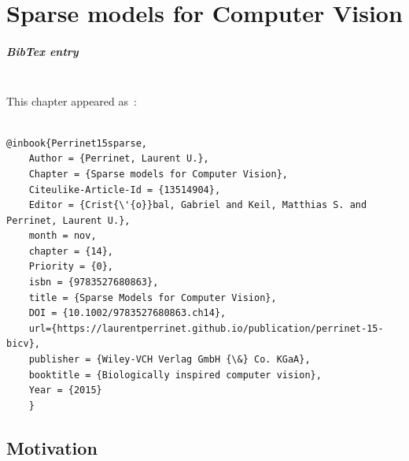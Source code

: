 \documentclass[a4paper, 11pt]{book}
\author{Perrinet}\title{\Title}
\newcommand{\AuthorA}{Laurent U.~Perrinet}%
\newcommand{\Title}{Sparse models for Computer Vision}%
\newcommand{\Abstract}{
The representation of images in the brain is known to be sparse.
That is, as neural activity is recorded in a visual area
---for instance the primary visual cortex of primates---
only a few neurons are active at a given time with respect to the whole population.
It is believed that such a property reflects the efficient match of the representation
with the statistics of natural scenes.
Applying such a paradigm to computer vision
therefore seems a promising approach towards more biomimetic algorithms.
Herein, we will describe a biologically-inspired approach to this problem.
First, we will describe an unsupervised learning paradigm
which is particularly adapted to the efficient coding of image patches.
Then, we will outline a complete multi-scale framework ---SparseLets---
implementing a biologically inspired sparse representation of natural images.
Finally, we will propose novel methods for integrating
prior information into these algorithms and provide some preliminary experimental results.
We will conclude by giving some perspective on applying such algorithms to computer vision.
More specifically, we will propose that bio-inspired approaches
may be applied to computer vision using predictive coding schemes,
sparse models being one simple and efficient instance of such schemes.
}%
\begin{document}
%
%
\frontmatter
\mainmatter
\addtocounter{chapter}{13} %
\chapter{\Title}

\paragraph{BibTex entry}~~\\

This chapter appeared as~\citep{Perrinet15sparse}:
\begin{verbatim}

@inbook{Perrinet15sparse,
	Author = {Perrinet, Laurent U.},
	Chapter = {Sparse models for Computer Vision},
	Citeulike-Article-Id = {13514904},
	Editor = {Crist{\'{o}}bal, Gabriel and Keil, Matthias S. and Perrinet, Laurent U.},
    month = nov,
	chapter = {14},
	Priority = {0},
	isbn = {9783527680863},
	title = {Sparse Models for Computer Vision},
	DOI = {10.1002/9783527680863.ch14},
    url={https://laurentperrinet.github.io/publication/perrinet-15-bicv},
    publisher = {Wiley-VCH Verlag GmbH {\&} Co. KGaA},
	booktitle = {Biologically inspired computer vision},
	Year = {2015}
	}
\end{verbatim}
\tableofcontents

\section{Motivation}
\end{document}

